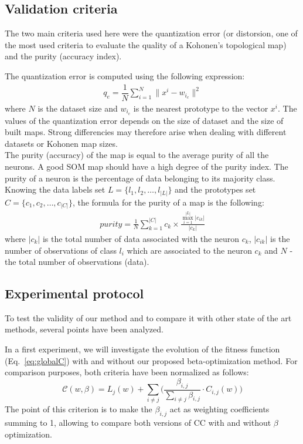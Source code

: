 \subsection{Validation criteria}
The two main criteria used here were the quantization error (or distorsion, one of the most used criteria to evaluate the quality of a Kohonen's topological map) and the purity (accuracy index).

The quantization error is computed using the following expression: \\
\begin{eqnarray}
q_e = \dfrac{1}{N}\sum_{i=1}^N \| x^{i} - w_{i_c} \|^{2}
\end{eqnarray}
where $N$ is the dataset size and $w_{i_c}$ is the nearest prototype to the vector $x^{i}$.
The values of the quantization error depends on the size of dataset and the size of built maps. Strong differencies may therefore arise when dealing with different datasets or Kohonen map sizes.\\

The purity (accuracy) of the map is equal to the average purity of all the neurons.
A good SOM map should have a high degree of the purity index.
The purity of a neuron is the percentage of data belonging to its majority class.
Knowing the data labels set $L = \{l_{1}, l_{2}, \ldots,  l_{|L|}\}$ and the prototypes set
$C = \{c_{1}, c_{2}, \ldots, c_{|C|}\}$, the formula for the purity of a map is the following:\\

\begin{eqnarray}
purity = \frac{1}{N} \sum_{k=1}^{|C|} c_{k}\times \frac{\max_{i=1}^{|L|}|c_{ik}|}{|c_{k}|}
\end{eqnarray}
where $|c_k|$ is the total number of data associated with the neuron $c_k$, $|c_{ik}| $ is the number of observations
of class $l_{i}$ which are associated to the neuron $c_{k}$ and $N$ - the total number of observations (data).\\%



\subsection{Experimental protocol}
To test the validity of our method and to compare it with other state of the art methods, several points have been analyzed. 

In a first experiment, we will investigate the evolution of the fitness function (Eq.~\ref{eq:globalC}) with and without our proposed beta-optimization method. For comparison purposes, both criteria have been normalized as follows: 
\begin{equation}
\mathcal{C}(w,\beta) = L_j(w) +
\sum_{i \neq j} \Big(\frac{\beta_{i,j}}{\sum_{i \neq j}\beta_{i,j}} \cdot C _{i,j}(w)\Big)	
\label{eq:globalC2}
\end{equation}
The point of this criterion is to make the $\beta_{i,j}$ act as weighting coefficients summing to 1, allowing to compare both versions of CC with and without $\beta$ optimization. \\

